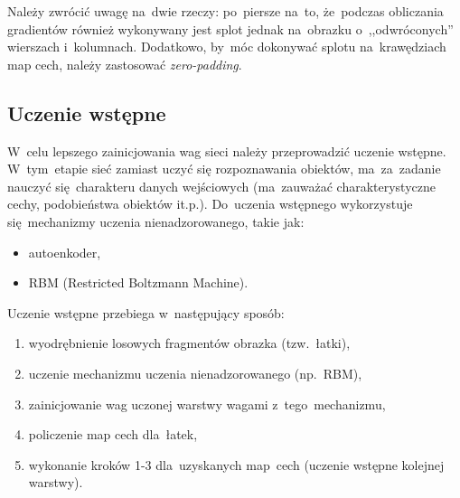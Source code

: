 Należy zwrócić uwagę na~dwie rzeczy: po~piersze na~to, że~podczas obliczania gradientów również wykonywany
jest splot jednak na~obrazku o~,,odwróconych'' wierszach i~kolumnach. Dodatkowo, by~móc dokonywać splotu
na~krawędziach map cech, należy zastosować \textit{zero-padding}.

\subsection{Uczenie wstępne}
W~celu lepszego zainicjowania wag sieci należy przeprowadzić uczenie wstępne. W~tym~etapie sieć zamiast uczyć
się rozpoznawania obiektów, ma~za~zadanie nauczyć się~charakteru danych wejściowych (ma~zauważać
charakterystyczne cechy, podobieństwa obiektów it.p.). Do~uczenia wstępnego wykorzystuje się~mechanizmy
uczenia nienadzorowanego, takie jak:
\begin{itemize}
  \item autoenkoder,
  \item RBM (Restricted Boltzmann Machine).
\end{itemize}

Uczenie wstępne przebiega w~następujący sposób:
\begin{enumerate}
  \item wyodrębnienie losowych fragmentów obrazka (tzw.~łatki),
  \item uczenie mechanizmu uczenia nienadzorowanego (np.~RBM),
  \item zainicjowanie wag uczonej warstwy wagami z~tego~mechanizmu,
  \item policzenie map cech dla~łatek,
  \item wykonanie kroków 1-3 dla~uzyskanych map~cech (uczenie wstępne kolejnej warstwy).
\end{enumerate}
